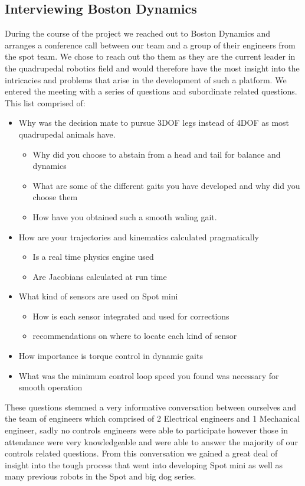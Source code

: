     \subsection{Interviewing Boston Dynamics} \label{subsec:BostonDynamicsInterview}
        During the course of the project we reached out to Boston Dynamics and arranges a conference call between our team and a group of their engineers from the spot team. We chose to reach out tho them as they are the current leader in the quadrupedal robotics field and would therefore have the most insight into the intricacies and problems that arise in the development of such a platform. We entered the meeting with a series of questions and subordinate related questions. This list comprised of:
        \begin{itemize}
            \item Why was the decision mate to pursue 3DOF legs instead of 4DOF as most quadrupedal animals have. 
            \begin{itemize}
                \item Why did you choose to abstain from a head and tail for balance and dynamics
                \item What are some of the different gaits you have developed and why did you choose them
                \item How have you obtained such a smooth waling gait.
            \end{itemize}
            \item How are your trajectories and kinematics calculated pragmatically
                \begin{itemize}
                    \item Is a real time physics engine used
                    \item Are Jacobians calculated at run time
                \end{itemize}
            \item What kind of sensors are used on Spot mini
                \begin{itemize}
                    \item How is each sensor integrated and used for corrections
                    \item recommendations on where to locate each kind of sensor
                \end{itemize}
            \item How importance is torque control in dynamic gaits
            \item What was the minimum control loop speed you found was necessary for smooth operation
        \end{itemize}
        These questions stemmed a very informative conversation between ourselves and the team of engineers which comprised of 2 Electrical engineers and 1 Mechanical engineer, sadly no controls engineers were able to participate however those in attendance were very knowledgeable and were able to answer the majority of our controls related questions. From this conversation we gained a great deal of insight into the tough process that went into developing Spot mini as well as many previous robots in the Spot and big dog series. 


